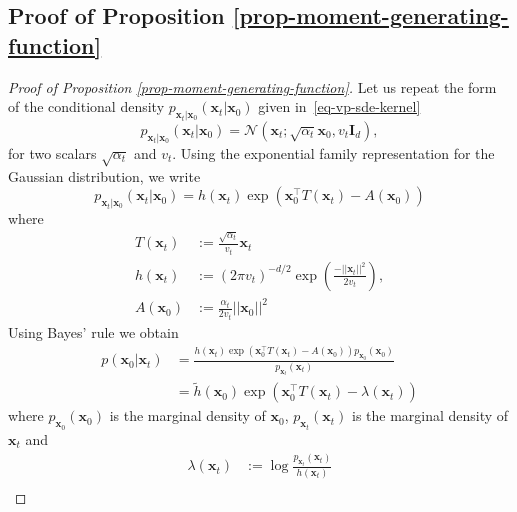 \subsection{Proof of Proposition \ref{prop-moment-generating-function}}
\label{sec:prop-moment-generating-function}

\begin{proof}[Proof of Proposition \ref{prop-moment-generating-function}]
Let us repeat the form of the conditional density $p_{\mathbf{x}_t\vert \mathbf{x}_0}(\mathbf{x}_{t}|\mathbf{x}_{0})$ given in~\eqref{eq-vp-sde-kernel}
\begin{equation*}
p_{\mathbf{x}_t|\mathbf{x}_0}(\mathbf{x}_t|\mathbf{x}_0) = \mathcal{N}(\mathbf{x}_t; \sqrt{\alpha_t} \mathbf{x}_0, v_t \mathbf{I}_{d}), 
\end{equation*} 
for two scalars $\sqrt{\alpha_{t}}$ and $v_{t}$.
Using the exponential family representation for the Gaussian distribution, we write
\begin{equation}
    p_{\mathbf{x}_t\vert \mathbf{x}_0}(\mathbf{x}_{t}|\mathbf{x}_0) = h(\mathbf{x}_{t})  \exp({\mathbf{x}_0^{\top}T(\mathbf{x}_{t}) - A(\mathbf{x}_0)} )
\end{equation}
where 
\begin{align}
    T(\mathbf{x}_t) &:= \frac{\sqrt{\alpha_t}}{v_t} \mathbf{x}_t\\
    h(\mathbf{x}_t) &:= (2\pi v_{t})^{-d/2}  \exp\left(\frac{-||\mathbf{x}_{t}||^2}{2v_{t}}\right),\\
    A(\mathbf{x}_{0}) &:=  \frac{\alpha_t}{2 v_t} ||\mathbf{x}_{0}||^2
\end{align}
Using Bayes' rule we obtain
\begin{equation}
\label{eq-bayes-rule-posterio-x0-xt}
\begin{aligned}
    p(\mathbf{x}_0|\mathbf{x}_{t}) &= \frac{
    h(\mathbf{x}_{t})  \exp({\mathbf{x}_0^{\top} T(\mathbf{x}_{t}) - A(\mathbf{x}_0)} ) p_{\mathbf{x}_0}(\mathbf{x}_0)} {p_{\mathbf{x}_t}(\mathbf{x}_t)}\\
    &= \tilde{h}(\mathbf{x}_0) \exp({\mathbf{x}_0^{\top} T(\mathbf{x}_{t}) - \lambda(\mathbf{x}_t)} ) 
\end{aligned}
\end{equation}
where $p_{\mathbf{x}_0}(\mathbf{x}_0)$ is the marginal density of $\mathbf{x}_0$, $p_{\mathbf{x}_t}(\mathbf{x}_t)$ is the marginal density of $\mathbf{x}_t$ and 
\begin{align}
    \lambda(\mathbf{x}_{t}) &:= \log \frac{p_{\mathbf{x}_t}(\mathbf{x}_{t})}{h(\mathbf{x}_{t})}\\

\end{align}
\end{proof}

